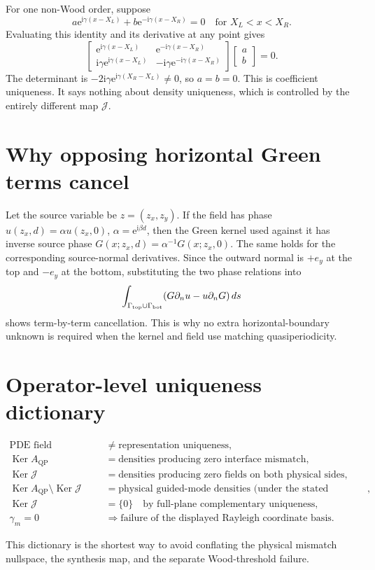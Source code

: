 \documentclass[11pt]{article}
\newcommand{\ii}{\mathrm i}
\newcommand{\ee}{\mathrm e}
\newcommand{\QP}{\mathrm{QP}}
\newcommand{\Ker}{\operatorname{Ker}}
\theoremstyle{plain}
\theoremstyle{definition}
\theoremstyle{remark}
\begin{document}
For one non-Wood order, suppose
\[
a\ee^{\ii\gamma(x-X_L)}+b\ee^{-\ii\gamma(x-X_R)}=0
\quad\text{for }X_L<x<X_R.
\]
Evaluating this identity and its derivative at any point gives
\[
\begin{bmatrix}
\ee^{\ii\gamma(x-X_L)}&\ee^{-\ii\gamma(x-X_R)}\\
\ii\gamma\ee^{\ii\gamma(x-X_L)}&
-\ii\gamma\ee^{-\ii\gamma(x-X_R)}
\end{bmatrix}
\begin{bmatrix}a\\b\end{bmatrix}=0.
\]
The determinant is
\(-2\ii\gamma\ee^{\ii\gamma(X_R-X_L)}\neq0\), so \(a=b=0\).
This is coefficient uniqueness.  It says nothing about density uniqueness,
which is controlled by the entirely different map \(\mathcal J\).

\section{Why opposing horizontal Green terms cancel}

Let the source variable be \(z=(z_x,z_y)\).  If the field has phase
\(u(z_x,d)=\alpha u(z_x,0)\), \(\alpha=\ee^{\ii\beta d}\), then the Green
kernel used against it has inverse source phase
\(G(x;z_x,d)=\alpha^{-1}G(x;z_x,0)\).  The same holds for the corresponding
source-normal derivatives.  Since the outward normal is \(+e_y\) at the top
and \(-e_y\) at the bottom, substituting the two phase relations into
\[
\int_{\Gamma_{\rm top}\cup\Gamma_{\rm bot}}
  (G\partial_n u-u\partial_nG)\,ds
\]
shows term-by-term cancellation.  This is why no extra horizontal-boundary
unknown is required when the kernel and field use matching quasiperiodicity.

\section{Operator-level uniqueness dictionary}

\begin{align*}
\text{PDE field uniqueness}
&\neq \text{representation uniqueness},\\
\Ker A_{\QP}
&=\text{densities producing zero interface mismatch},\\
\Ker\mathcal J
&=\text{densities producing zero fields on both physical sides},\\
\Ker A_{\QP}\setminus\Ker\mathcal J
&=\text{physical guided-mode densities (under the stated hypotheses)},\\
\Ker\mathcal J
&=\{0\}\quad\text{by full-plane complementary uniqueness},\\
\gamma_m=0
&\Rightarrow\text{failure of the displayed Rayleigh coordinate basis}.
\end{align*}

This dictionary is the shortest way to avoid conflating the physical mismatch
nullspace, the synthesis map, and the separate Wood-threshold failure.
\end{document}
